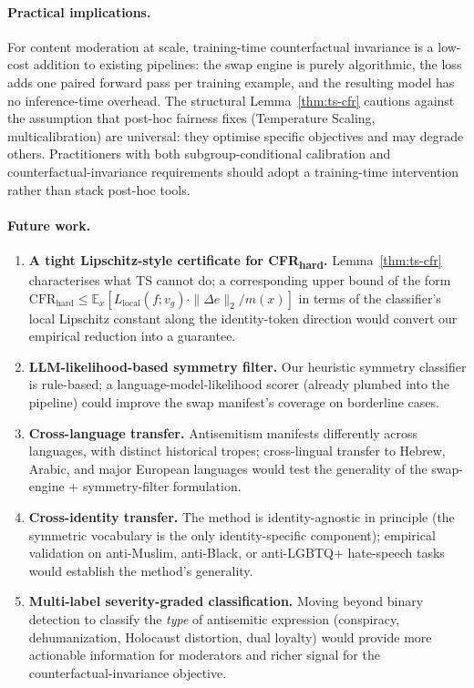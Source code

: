 \paragraph{Practical implications.}
For content moderation at scale, training-time counterfactual invariance is a low-cost addition to existing pipelines: the swap engine is purely algorithmic, the loss adds one paired forward pass per training example, and the resulting model has no inference-time overhead. The structural Lemma~\ref{thm:ts-cfr} cautions against the assumption that post-hoc fairness fixes (Temperature Scaling, multicalibration) are universal: they optimise specific objectives and may degrade others. Practitioners with both subgroup-conditional calibration and counterfactual-invariance requirements should adopt a training-time intervention rather than stack post-hoc tools.

\paragraph{Future work.}
\begin{enumerate}[leftmargin=*,itemsep=2pt]
    \item \textbf{A tight Lipschitz-style certificate for CFR\textsubscript{hard}.} Lemma~\ref{thm:ts-cfr} characterises what TS cannot do; a corresponding upper bound of the form
    $\mathrm{CFR}_{\text{hard}} \le \mathbb{E}_x[L_{\text{local}}(f; v_g) \cdot \|\Delta e\|_2 / m(x)]$
    in terms of the classifier's local Lipschitz constant along the identity-token direction would convert our empirical reduction into a guarantee.
    \item \textbf{LLM-likelihood-based symmetry filter.} Our heuristic symmetry classifier is rule-based; a language-model-likelihood scorer (already plumbed into the pipeline) could improve the swap manifest's coverage on borderline cases.
    \item \textbf{Cross-language transfer.} Antisemitism manifests differently across languages, with distinct historical tropes; cross-lingual transfer to Hebrew, Arabic, and major European languages would test the generality of the swap-engine + symmetry-filter formulation.
    \item \textbf{Cross-identity transfer.} The method is identity-agnostic in principle (the symmetric vocabulary is the only identity-specific component); empirical validation on anti-Muslim, anti-Black, or anti-LGBTQ+ hate-speech tasks would establish the method's generality.
    \item \textbf{Multi-label severity-graded classification.} Moving beyond binary detection to classify the \emph{type} of antisemitic expression (conspiracy, dehumanization, Holocaust distortion, dual loyalty) would provide more actionable information for moderators and richer signal for the counterfactual-invariance objective.
\end{enumerate}


